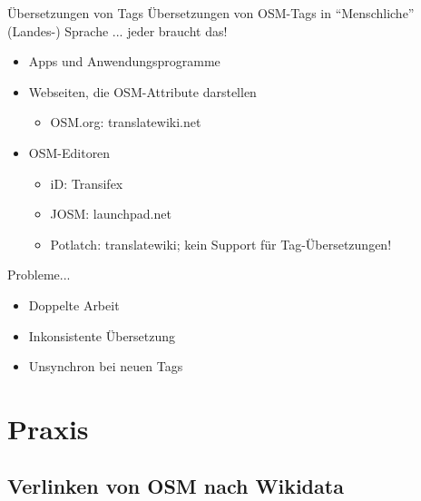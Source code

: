 \documentclass{beamer}
\begin{document}
\begin{frame}{Übersetzungen von Tags}
  Übersetzungen von OSM-Tags in "`Menschliche"' (Landes-) Sprache ... jeder braucht das!
  \begin{itemize}
    \item Apps und Anwendungsprogramme \pause
    \item Webseiten, die OSM-Attribute darstellen 
      \begin{itemize}
        \item OSM.org: translatewiki.net
      \end{itemize}
      \pause
    \item OSM-Editoren
      \begin{itemize}
        \item iD: Transifex
        \item JOSM: launchpad.net
        \item Potlatch: translatewiki; kein Support für Tag-Übersetzungen!
      \end{itemize}
  \end{itemize}

  Probleme...
  \pause
  \begin{itemize}
    \item Doppelte Arbeit
    \item Inkonsistente Übersetzung
    \item Unsynchron bei neuen Tags
  \end{itemize}

\end{frame}

\section{Praxis}

\subsection{Verlinken von OSM nach Wikidata}
\end{document}
